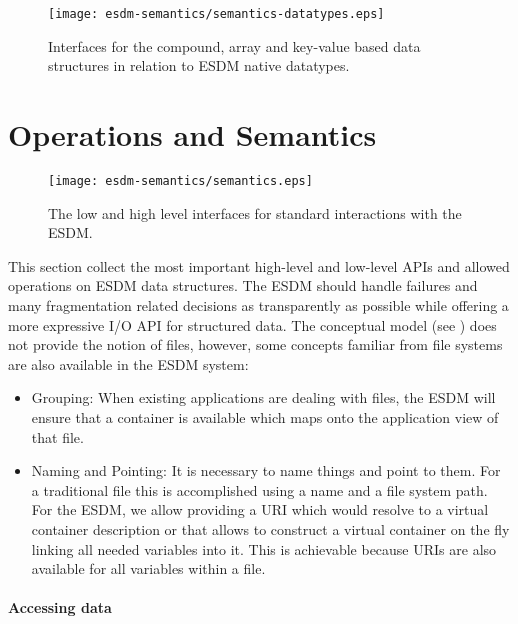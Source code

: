 \begin{figure}
	\centering
	\texttt{[image: esdm-semantics/semantics-datatypes.eps]}
	\caption{Interfaces for the compound, array and key-value based data structures in relation to ESDM native datatypes.}
	\label{fig:datatypes}
\end{figure}









\clearpage
\section{Operations and Semantics}
\label{sec: viewpoints/logical/semantics}


\begin{figure}
	\centering
	\texttt{[image: esdm-semantics/semantics.eps]}
	\caption{The low and high level interfaces for standard interactions with the ESDM.}
	\label{fig:apis ll and high}
\end{figure}

This section collect the most important high-level and low-level APIs and allowed operations on ESDM data structures.
The ESDM should handle failures and many fragmentation related decisions as transparently as possible while offering a more expressive I/O API for structured data.
The conceptual model (see ) does not provide the notion of files, however, some concepts familiar from file systems are also available in the ESDM system:
\begin{itemize}
\item Grouping: When existing applications are dealing with files, the ESDM will ensure that a container is available which maps onto the application view of that file.
\item Naming and Pointing: It is necessary to name things and point to them.
For a traditional file this is accomplished using a name and a file system path.
For the ESDM, we allow providing a URI which would resolve to a virtual container description or that allows to construct a virtual container on the fly linking all needed variables into it.
This is achievable because URIs are also available for all variables within a file.
\end{itemize}


\paragraph{Accessing data}

